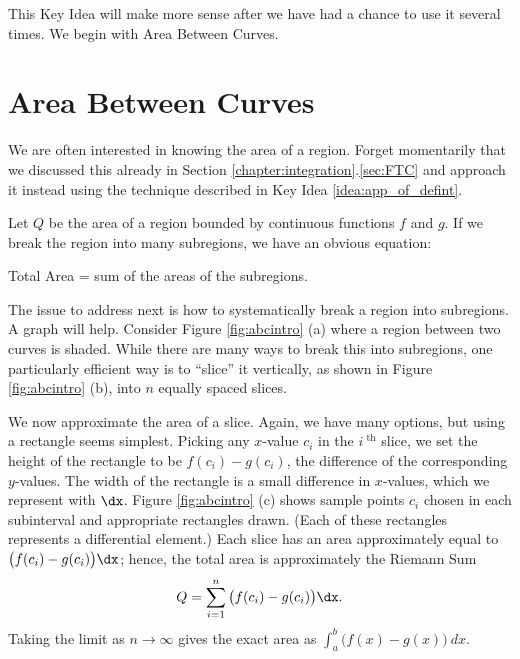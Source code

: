 This Key Idea will make more sense after we have had a chance to use it several times. We begin with Area Between Curves.
\clearpage

\section*{Area Between Curves}\label{sec:ABC}

We are often interested in knowing the area of a region. Forget momentarily that we discussed this already in Section  \ref{chapter:integration}.\ref{sec:FTC} and approach it instead using the technique described in Key Idea \ref{idea:app_of_defint}. 

Let $Q$ be the area of a region bounded by continuous functions $f$ and $g$. If we break the region into many subregions, we have an obvious equation:

\hfill Total Area = sum of the areas of the subregions. \hfill \null

The issue to address next is how to systematically break a region into subregions. A graph will help. Consider Figure \ref{fig:abcintro} (a) where a region between two curves is shaded. While there are many ways to break this into subregions, one particularly efficient way is to ``slice'' it vertically, as shown in Figure \ref{fig:abcintro} (b), into $n$ equally spaced slices. 

We now approximate the area of a slice. Again, we have many options, but using a rectangle seems simplest. Picking any $x$-value $c_i$ in the $i^\text{ th}$ slice, we set the height of the rectangle to be $f(c_i)-g(c_i)$, the difference of the corresponding $y$-values. The width of the rectangle is a small difference in $x$-values, which we represent with $\dx$. Figure \ref{fig:abcintro} (c) shows sample points $c_i$ chosen in each subinterval and appropriate rectangles drawn. (Each of these rectangles represents a differential element.) Each slice has an area approximately equal to $\big(f(c_i)-g(c_i)\big)\dx$; hence, the total area is approximately the Riemann Sum
$$Q = \sum_{i=1}^n \big(f(c_i)-g(c_i)\big)\dx.$$
Taking the limit as $n\to \infty$ gives the exact area as $\int_a^b \big(f(x)-g(x)\big)\ dx.$


